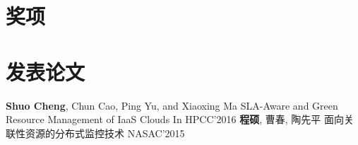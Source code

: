\documentclass[11pt,a4paper]{moderncv}
\begin{document}
\section{奖项}

\vspace*{-1mm}

\section{发表论文}
{\textbf{Shuo Cheng}\textnormal{, Chun Cao, Ping Yu, and Xiaoxing Ma}}
{ SLA-Aware and Green Resource Management of IaaS Clouds}
{ In HPCC'2016}{}{}
{\textbf{程硕}\textnormal{, 曹春, 陶先平}}
{ 面向关联性资源的分布式监控技术}
{ NASAC'2015}{}{}



\closesection{}                   %
\renewcommand{\listitemsymbol}{-} %
\end{document}
